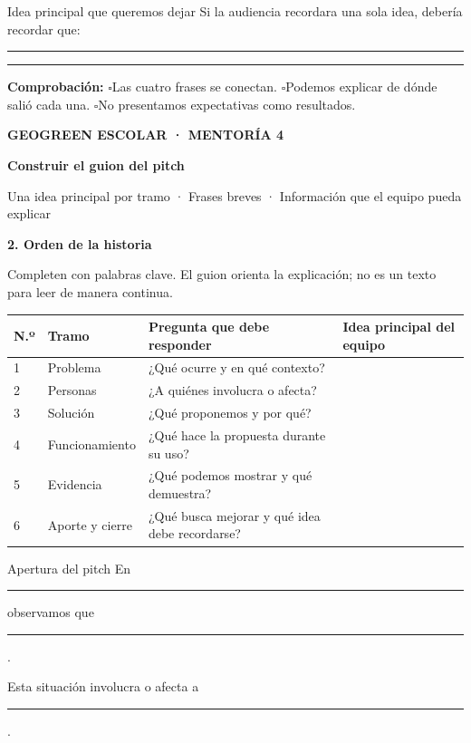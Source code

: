 \documentclass[10pt,a4paper]{article}
\newcommand{\writearea}[1]{\vspace{#1}\hrule height 0.35pt\vspace{4mm}\hrule height 0.35pt}
\newcommand{\checkline}[1]{$\square$\hspace{1.5mm}#1}
\newcommand{\pagehead}[2]{%
  {\small\bfseries\textcolor{AIEPRed}{GEOGREEN ESCOLAR · MENTORÍA 4}}\par
  \vspace{2mm}
  {\LARGE\bfseries\color{AIEPNavy}#1\par}
  {\normalsize\color{AIEPMuted}#2\par}
  \vspace{4mm}
}
\begin{document}
\begin{accentfield}[height=42mm]{Idea principal que queremos dejar}
Si la audiencia recordara una sola idea, debería recordar que:
\writearea{12mm}
\end{accentfield}

\begin{tcolorbox}[colback=AIEPBlueSoft,colframe=AIEPLine,boxrule=0.5pt,arc=1mm,left=3mm,right=3mm,top=2mm,bottom=2mm]
\textbf{Comprobación:} \checkline{Las cuatro frases se conectan.}\quad
\checkline{Podemos explicar de dónde salió cada una.}\quad
\checkline{No presentamos expectativas como resultados.}
\end{tcolorbox}

\newpage
\pagehead{Construir el guion del pitch}{Una idea principal por tramo · Frases breves · Información que el equipo pueda explicar}

{\large\bfseries\color{AIEPNavy}2. Orden de la historia}\par
{\small Completen con palabras clave. El guion orienta la explicación; no es un texto para leer de manera continua.}

\small
\begin{tabularx}{\textwidth}{|C{13mm}|p{34mm}|p{52mm}|Y|}
\hline
\textbf{N.º} & \textbf{Tramo} & \textbf{Pregunta que debe responder} & \textbf{Idea principal del equipo} \\
\hline
\rule{0pt}{18mm}1 & Problema & ¿Qué ocurre y en qué contexto? & \\
\hline
\rule{0pt}{18mm}2 & Personas & ¿A quiénes involucra o afecta? & \\
\hline
\rule{0pt}{18mm}3 & Solución & ¿Qué proponemos y por qué? & \\
\hline
\rule{0pt}{18mm}4 & Funcionamiento & ¿Qué hace la propuesta durante su uso? & \\
\hline
\rule{0pt}{18mm}5 & Evidencia & ¿Qué podemos mostrar y qué demuestra? & \\
\hline
\rule{0pt}{18mm}6 & Aporte y cierre & ¿Qué busca mejorar y qué idea debe recordarse? & \\
\hline
\end{tabularx}
\normalsize

\vspace{4mm}
\begin{accentfield}[height=35mm]{Apertura del pitch}
En \rule{36mm}{0.35pt} observamos que \rule{92mm}{0.35pt}.\par
Esta situación involucra o afecta a \rule{85mm}{0.35pt}.
\end{accentfield}
\end{document}

